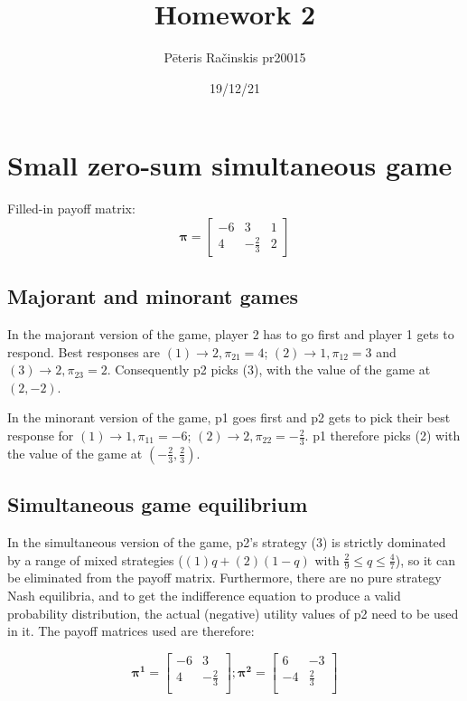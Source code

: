 \documentclass[12pt, a4paper]{article}
\author{Pēteris Račinskis pr20015}
\date{19/12/21}
\begin{document}
\title{Homework 2}

\maketitle

\section{Small zero-sum simultaneous game}

Filled-in payoff matrix:
\begin{equation}
\boldsymbol{\pi}=\begin{bmatrix}
    -6 & 3 & 1 \\
    4 & -\frac{2}{3} & 2 
\end{bmatrix}
\end{equation}

\subsection{Majorant and minorant games}

In the majorant version of the game, player 2 has to go first and player 1 gets to respond. Best responses are $(1) \rightarrow 2, \pi_{21}=4$; $(2) \rightarrow 1, \pi_{12}=3$ and $(3) \rightarrow 2, \pi_{23}=2$. Consequently p2 picks (3), with the value of the game at $(2,-2)$.

In the minorant version of the game, p1 goes first and p2 gets to pick their best response for $(1) \rightarrow 1, \pi_{11}=-6$; $(2) \rightarrow 2, \pi_{22}=-\frac{2}{3}$. p1 therefore picks (2) with the value of the game at $(-\frac{2}{3}, \frac{2}{3})$.

\subsection{Simultaneous game equilibrium}

In the simultaneous version of the game, p2's strategy (3) is strictly dominated by a range of mixed strategies ($(1)q+(2)(1-q)$ with $\frac{2}{9} \leq q \leq \frac{4}{7}$), so it can be eliminated from the payoff matrix. Furthermore, there are no pure strategy Nash equilibria, and to get the indifference equation to produce a valid probability distribution, the actual (negative) utility values of p2 need to be used in it. The payoff matrices used are therefore:

\begin{equation}
    \boldsymbol{\pi^{1}}=\begin{bmatrix}
        -6 & 3 \\
        4 & -\frac{2}{3} \\ 
    \end{bmatrix}
    ;
    \boldsymbol{\pi^{2}}=\begin{bmatrix}
        6 & -3 \\
        -4 & \frac{2}{3} \\ 
    \end{bmatrix}
\end{equation}
\end{document}
